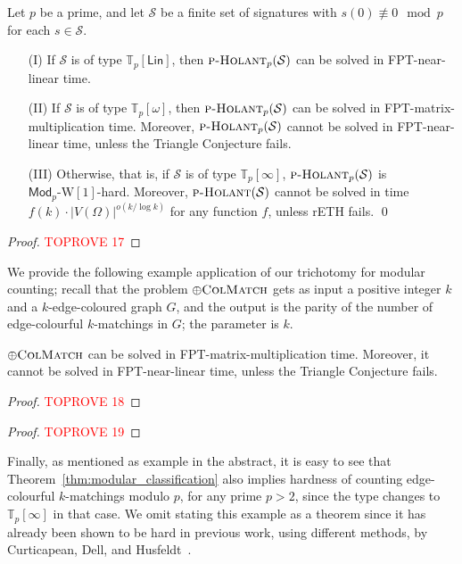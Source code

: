 \documentclass[authorcolumns,numberwithinsect]{no-lipics-v2022}
\newcommand{\W}{\mathrm{W}}
\newcommand{\holantprob}{\text{\sc{p-Holant}}}
\begin{document}
\begin{theorem}\label{thm:modular_classification}
     Let $p$ be a prime, and let $\mathcal{S}$ be a finite set of signatures with $s(0)\not\equiv 0 \mod p$ for each $s\in \mathcal{S}$.
    \begin{itemize}
        \item[(I)] If $\mathcal{S}$ is of type $\mathbb{T}_p[\mathsf{Lin}]$, then $\holantprob_p(\mathcal{S})$ can be solved in FPT-near-linear time.
        \item[(II)] If $\mathcal{S}$ is of type $\mathbb{T}_p[\omega]$, then $\holantprob_p(\mathcal{S})$ can be solved in FPT-matrix-multiplication time. Moreover, $\holantprob_p(\mathcal{S})$ cannot be solved in FPT-near-linear time, unless the Triangle Conjecture fails.
        \item[(III)] Otherwise, that is, if $\mathcal{S}$ is of type $\mathbb{T}_p[\infty]$, $\holantprob_p(\mathcal{S})$ is $\mathsf{Mod}_p\text{-}\W[1]$-hard. Moreover, $\holantprob(\mathcal{S})$ cannot be solved in time $f(k)\cdot |V(\Omega)|^{o(k/\log k)}$ for any function $f$, unless rETH fails.  \qed
    \end{itemize}
\end{theorem}
\begin{proof}\textcolor{red}{TOPROVE 17}\end{proof}


We provide the following example application of our trichotomy for modular counting; recall that the problem $\oplus\textsc{ColMatch}$ gets as input a positive integer $k$ and a $k$-edge-coloured graph $G$, and the output is the parity of the number of edge-colourful $k$-matchings in $G$; the parameter is $k$.
\begin{corollary}
    $\oplus\textsc{ColMatch}$ can be solved in FPT-matrix-multiplication time. Moreover, it cannot be solved in FPT-near-linear time, unless the Triangle Conjecture fails.
\end{corollary}
\begin{proof}\textcolor{red}{TOPROVE 18}\end{proof}

\begin{proof}\textcolor{red}{TOPROVE 19}\end{proof}

Finally, as mentioned as example in the abstract, it is easy to see that Theorem~\ref{thm:modular_classification} also implies hardness of counting edge-colourful $k$-matchings modulo $p$, for any prime $p>2$, since the type changes to $\mathbb{T}_p[\infty]$ in that case. We omit stating this example as a theorem since it has already been shown to be hard in previous work, using different methods, by Curticapean, Dell, and Husfeldt~\cite{CurticapeanDH21}.
\end{document}
